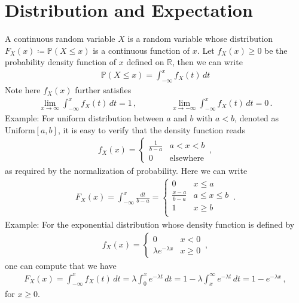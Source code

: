 \documentclass[11pt, onesided]{book}
\theoremstyle{break}
\theoremstyle{break}
\newcommand{\R}{\mathbb{R}}
\newcommand{\example}{\color{green}Example: \color{black}}
\begin{document}
\section[Distribution and Expectation]{\color{red} Distribution and Expectation\color{black}}
A continuous random variable $X$ is a random variable whose distribution $F_X(x) \coloneqq \mathbb{P}(X\leq x)$ is a continuous function of $x$. Let $f_X(x)\geq 0$ be the probability density function of $x$ defined on $\R$, then we can write
\begin{align*}
\mathbb{P}(X\leq x) = \int_{-\infty}^x f_X(t)\, dt
\end{align*} 
Note here $f_X(x)$ further satisfies
\begin{align*}
\lim_{x\to \infty} \int_{-\infty}^x f_X(t)\, dt = 1 \,,\qquad\qquad
\lim_{x\to -\infty}\int_{-\infty}^x f_X(t) \, dt =0\,.
\end{align*}
\example For uniform distribution between $a$ and $b$ with $a<b$, denoted as $\text{Uniform}[a,b]$, it is easy to verify that the density function reads
\begin{align*}
f_X(x) = 
\begin{cases}
\frac{1}{b-a} & a<x<b \\
0 & \text{elsewhere}
\end{cases}\,,
\end{align*}
as required by the normalization of probability. Here we can write
\begin{align*}
F_X(x) = \int_{-\infty}^x \frac{dt}{b-a} = 
\begin{cases}
0 & x\leq a\\
\frac{x-a}{b-a} & a\leq x\leq b\\
1 & x\geq b\\
\end{cases}\,.
\end{align*}
\example For the exponential distribution whose density function is defined by
\begin{align*}
f_X(x) = \begin{cases} 
0& x<0 \\
\lambda e^{-\lambda x}& x\geq 0
\end{cases}\,,
\end{align*}
one can compute that we have
\begin{align*}
F_X(x) = \int_{-\infty}^x f_X(t)\, dt = 
\lambda \int_0^x e^{-\lambda t}\, dt  = 1-\lambda \int_{x}^\infty e^{-\lambda t}\,dt = 1-e^{-\lambda x} \,,
\end{align*}
for $x\geq 0$. \\
\end{document}
